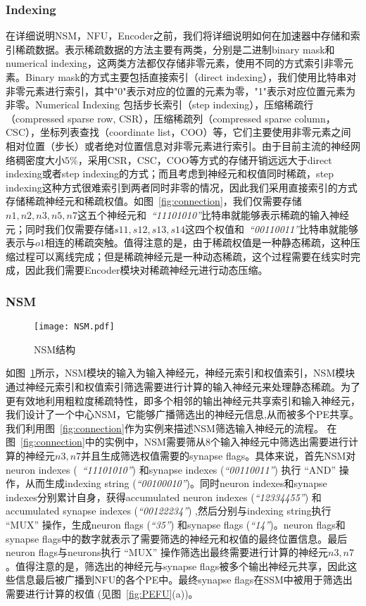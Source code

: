 \subsubsection{Indexing}
在详细说明NSM，NFU，Encoder之前，我们将详细说明如何在加速器中存储和索引稀疏数据。表示稀疏数据的方法主要有两类，分别是二进制binary mask和numerical indexing，这两类方法都仅存储非零元素，使用不同的方式索引非零元素。Binary mask的方式主要包括直接索引（direct indexing），我们使用比特串对非零元素进行索引，其中"0"表示对应的位置的元素为零，"1"表示对应位置元素为非零。Numerical Indexing 包括步长索引（step indexing），压缩稀疏行（compressed sparse row, CSR），压缩稀疏列（compressed sparse column，CSC），坐标列表查找（coordinate list，COO）等，它们主要使用非零元素之间相对位置（步长）或者绝对位置信息对非零元素进行索引。由于目前主流的神经网络稠密度大小$5\%$，采用CSR，CSC，COO等方式的存储开销远远大于direct indexing或者step indexing的方式；而且考虑到神经元和权值同时稀疏，step indexing这种方式很难索引到两者同时非零的情况，因此我们采用直接索引的方式存储稀疏神经元和稀疏权值。如图~\ref{fig:connection}，我们仅需要存储$n1, n2, n3, n5, n7$这五个神经元和~\emph{“11101010”}比特串就能够表示稀疏的输入神经元；同时我们仅需要存储$s11, s12, s13, s14$这四个权值和~\emph{“00110011”}比特串就能够表示与$o1$相连的稀疏突触。值得注意的是，由于稀疏权值是一种静态稀疏，这种压缩过程可以离线完成；但是稀疏神经元是一种动态稀疏，这个过程需要在线实时完成，因此我们需要Encoder模块对稀疏神经元进行动态压缩。

\subsubsection{NSM}
\begin{figure}[h]
\centering
\texttt{[image: NSM.pdf]}
\caption{NSM结构}
\label{fig:NSM}
\end{figure}

如图~\ref{fig:NSM}所示，NSM模块的输入为输入神经元，神经元索引和权值索引，NSM模块通过神经元索引和权值索引筛选需要进行计算的输入神经元来处理静态稀疏。为了更有效地利用粗粒度稀疏特性，即多个相邻的输出神经元共享索引和输入神经元，我们设计了一个中心NSM，它能够广播筛选出的神经元信息,从而被多个PE共享。我们利用图~\ref{fig:connection}作为实例来描述NSM筛选输入神经元的流程。
在图~\ref{fig:connection}中的实例中，NSM需要筛从8个输入神经元中筛选出需要进行计算的神经元$n3, n7$并且生成筛选权值需要的synapse flags。具体来说，首先NSM对neuron indexes (~\emph{“11101010”}) 和synapse indexes (\emph{“00110011”}) 执行 “AND” 操作，从而生成indexing string (\emph{“00100010”})。同时neuron indexes和synapse indexes分别累计自身，获得accumulated neuron indexes (\emph{“12334455”}) 和accumulated synapse indexes (\emph{“00122234”}) ,然后分别与indexing string执行 “MUX” 操作，生成neuron flags (\emph{“35”}) 和synapse flags (\emph{“14”})。neuron flags和synapse flags中的数字就表示了需要筛选的神经元和权值的最终位置信息。最后neuron flags与neurons执行 “MUX” 操作筛选出最终需要进行计算的神经元$n3, n7$。值得注意的是，筛选出的神经元与synapse flags被多个输出神经元共享，因此这些信息最后被广播到NFU的各个PE中。最终synapse flags在SSM中被用于筛选出需要进行计算的权值 (见图~\ref{fig:PEFU}(a))。

